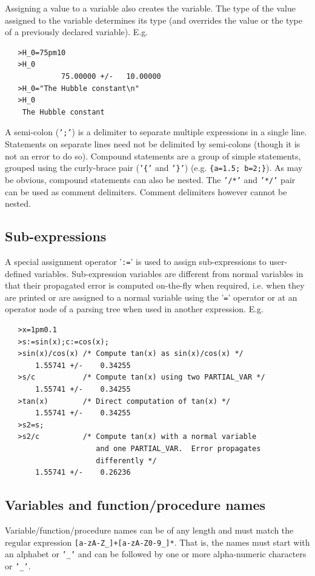 \documentclass[12pt]{article}
\begin{document}
Assigning a value to a variable also creates the variable.  The type
of the value assigned to the variable determines its type (and overrides
the value or the type of a previously declared variable).  E.g.
\begin{verbatim}
   >H_0=75pm10
   >H_0
             75.00000 +/-   10.00000
   >H_0="The Hubble constant\n"
   >H_0
    The Hubble constant
\end{verbatim}
A semi-colon ({\tt ';'}) is a delimiter to separate multiple
expressions in a single line.  Statements on separate lines need not
be delimited by semi-colons (though it is not an error to do so).
Compound statements are a group of simple statements, grouped using the
curly-brace pair ({\tt '\{'} and {\tt '\}'}) (e.g. {\tt \{a=1.5;
b=2;\}}). As may be obvious, compound statements can also be nested.
The {\tt '/\/*'} and {\tt '*/'} pair can be used as comment
delimiters.  Comment delimiters however cannot be nested. 

\subsection{Sub-expressions}
\label{APPEN:SUBEXPRESSIONS}

A special assignment operator '{\tt :=}' is used to assign
sub-expressions to user-defined variables.  Sub-expression variables
are different from normal variables in that their propagated error is
computed on-the-fly when required, i.e.  when they are printed or are
assigned to a normal variable using the '{\tt =}' operator or at an
operator node of a parsing tree when used in another expression.  E.g.
\begin{verbatim}
   >x=1pm0.1
   >s:=sin(x);c:=cos(x);
   >sin(x)/cos(x) /* Compute tan(x) as sin(x)/cos(x) */
       1.55741 +/-    0.34255
   >s/c           /* Compute tan(x) using two PARTIAL_VAR */
       1.55741 +/-    0.34255
   >tan(x)        /* Direct computation of tan(x) */
       1.55741 +/-    0.34255
   >s2=s;
   >s2/c          /* Compute tan(x) with a normal variable
                     and one PARTIAL_VAR.  Error propagates 
                     differently */
       1.55741 +/-    0.26236
\end{verbatim}
\subsection{Variables and function/procedure names}

Variable/function/procedure names can be of any length and must match
the regular expression {\tt [a-zA-Z\_]+[a-zA-Z0-9\_]*}.  That is, the
names must start with an alphabet or {\tt '\_'} and can be followed by
one or more alpha-numeric characters or {\tt '\_'}.
\end{document}
